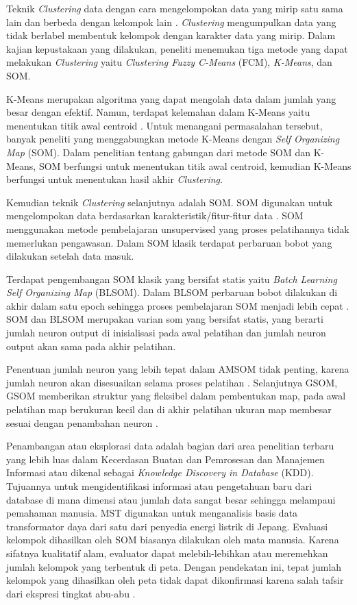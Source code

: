 Teknik \textit{Clustering} data dengan cara mengelompokan data yang mirip satu sama lain dan berbeda dengan kelompok lain \citep{Han2011}. \textit{Clustering} mengumpulkan data yang tidak berlabel membentuk kelompok dengan karakter data yang mirip. Dalam kajian kepustakaan yang dilakukan, peneliti menemukan tiga metode yang dapat melakukan \textit{Clustering} yaitu \textit{Clustering Fuzzy C-Means} (FCM), \textit{K-Means}, dan SOM.

K-Means merupakan algoritma yang dapat mengolah data dalam jumlah yang besar dengan efektif. Namun, terdapat kelemahan dalam K-Means yaitu menentukan titik awal centroid  \citep{Nugroho2012}. Untuk menangani permasalahan tersebut, banyak peneliti yang menggabungkan metode K-Means dengan \textit{Self Organizing Map} (SOM). Dalam penelitian tentang gabungan dari metode SOM dan K-Means, SOM berfungsi untuk menentukan titik awal centroid, kemudian K-Means berfungsi untuk menentukan hasil akhir \textit{Clustering}.

Kemudian teknik \textit{Clustering} selanjutnya adalah SOM. SOM digunakan untuk mengelompokan data berdasarkan karakteristik/fitur-fitur data \citep{Lestari2014}. SOM menggunakan metode pembelajaran unsupervised yang proses pelatihannya tidak memerlukan pengawasan. Dalam SOM klasik terdapat perbaruan bobot yang dilakukan setelah data masuk.

Terdapat pengembangan SOM klasik yang bersifat statis yaitu \textit{Batch Learning Self Organizing Map} (BLSOM). Dalam BLSOM perbaruan bobot dilakukan di akhir dalam satu epoch sehingga proses pembelajaran SOM menjadi lebih cepat \citep{VasighiAmini2017}. SOM dan BLSOM merupakan varian som yang bersifat statis, yang berarti jumlah neuron output di inisialisasi pada awal pelatihan dan jumlah neuron output akan sama pada akhir pelatihan.

Penentuan jumlah neuron yang lebih tepat dalam AMSOM tidak penting, karena jumlah neuron akan disesuaikan selama proses pelatihan \citep{vandenHerik2017}. Selanjutnya GSOM, GSOM memberikan struktur yang fleksibel dalam pembentukan map, pada awal pelatihan map berukuran kecil dan di akhir pelatihan ukuran map membesar sesuai dengan penambahan neuron \citep{VasighiAmini2017}.

Penambangan atau eksplorasi data adalah bagian dari area penelitian terbaru yang lebih luas dalam Kecerdasan Buatan dan Pemrosesan dan Manajemen Informasi atau dikenal sebagai \textit{Knowledge Discovery in Database} (KDD). Tujuannya untuk mengidentifikasi informasi atau pengetahuan baru dari database di mana dimensi atau jumlah data sangat besar sehingga melampaui pemahaman manusia. MST digunakan untuk menganalisis basis data transformator daya dari satu dari penyedia energi listrik di Jepang. Evaluasi kelompok dihasilkan oleh SOM biasanya dilakukan oleh mata manusia. Karena sifatnya kualitatif alam, evaluator dapat melebih-lebihkan atau meremehkan jumlah kelompok yang terbentuk di peta. Dengan pendekatan ini, tepat jumlah kelompok yang dihasilkan oleh peta tidak dapat dikonfirmasi karena salah tafsir dari ekspresi tingkat abu-abu \citep{Tokutaka2001}.

